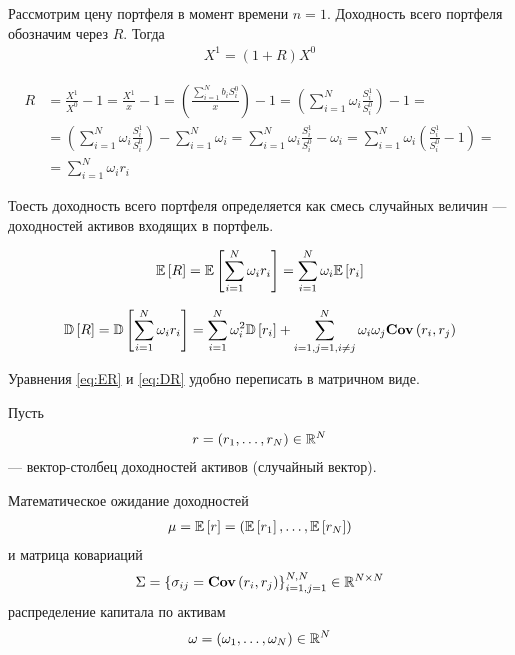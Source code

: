 Рассмотрим цену портфеля в момент времени $n=1$. Доходность всего портфеля обозначим через $R$. Тогда
\begin{align}
	X^1 = (1 + R) X^0
\end{align}

\begin{align}
	R &= \frac{X^1}{X^0} - 1 
	= \frac{X^1}{x} - 1 
	= \left(\frac{\sum_{i=1}^{N}b_i S_i^0}{x}\right) - 1 
	= \left(\sum_{i=1}^{N} \omega_i \frac{S_i^1}{S_i^0}\right) - 1 = \\
	&= \left(\sum_{i=1}^{N} \omega_i \frac{S_i^1}{S_i^0}\right) - \sum_{i=1}^{N} \omega_i
	= \sum_{i=1}^{N} \omega_i \frac{S_i^1}{S_i^0} - \omega_i 
	= \sum_{i=1}^{N} \omega_i \left(\frac{S_i^1}{S_i^0} - 1\right) = \\
	&= \sum_{i=1}^{N} \omega_i r_i
\end{align}

Тоесть доходность всего портфеля определяется как смесь случайных величин --- доходностей активов
входящих в портфель.

\begin{align} \label{eq:ER}
	\mathbb{E}\left[R\right] = \mathbb{E}\left[\sum_{i=1}^{N} \omega_i r_i\right] 
	= \sum_{i=1}^{N} \omega_i \mathbb{E}\left[r_i\right]
\end{align}

\begin{align} \label{eq:DR}
	\mathbb{D}\left[R\right] = \mathbb{D}\left[\sum_{i=1}^{N} \omega_i r_i\right] 
	= \sum_{i=1}^{N} \omega_i^2 \mathbb{D}\left[r_i\right] 
	+ \sum_{i=1, j=1, i \ne j}^{N} \omega_i \omega_j \textbf{Cov}\left(r_i, r_j\right)
\end{align}

Уравнения \ref{eq:ER} и \ref{eq:DR} удобно переписать в матричном виде. 

Пусть 
\begin{align}
	r = (r_1, \dots, r_N) \in \mathbb{R}^N
\end{align}
--- вектор-столбец доходностей активов (случайный вектор).

Математическое ожидание доходностей
\begin{align}
	\mu = \mathbb{E}\left[r\right] = \left(\mathbb{E}\left[r_1\right], \dots, \mathbb{E}\left[r_N\right]\right)	
\end{align}
и матрица ковариаций
\begin{align}
	\Sigma = \left\{\sigma_{ij} = \textbf{Cov}\left(r_i, r_j\right)\right\}_{i=1, j=1}^{N, N} \in \mathbb{R}^{N \times N}
\end{align}
распределение капитала по активам
\begin{align}
	\omega = \left(\omega_1, \dots, \omega_N \right) \in \mathbb{R}^N
\end{align}

